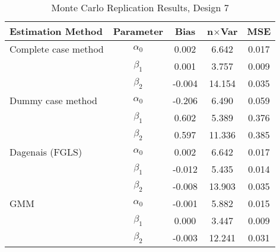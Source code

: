 \begin{table}
\centering
\caption{Monte Carlo Replication Results, Design 7}
\label{table:MCReplicationResultsDesign7}
\begin{tabular}{lcccc}
\toprule
Estimation Method & Parameter & Bias & n$\times$Var & MSE \\
\midrule
Complete case method & $\alpha_0$ & 0.002 & 6.642 & 0.017 \\
 & $\beta_1$ & 0.001 & 3.757 & 0.009 \\
 & $\beta_2$ & -0.004 & 14.154 & 0.035 \\
Dummy case method & $\alpha_0$ & -0.206 & 6.490 & 0.059 \\
 & $\beta_1$ & 0.602 & 5.389 & 0.376 \\
 & $\beta_2$ & 0.597 & 11.336 & 0.385 \\
Dagenais (FGLS) & $\alpha_0$ & 0.002 & 6.642 & 0.017 \\
 & $\beta_1$ & -0.012 & 5.435 & 0.014 \\
 & $\beta_2$ & -0.008 & 13.903 & 0.035 \\
GMM & $\alpha_0$ & -0.001 & 5.882 & 0.015 \\
 & $\beta_1$ & 0.000 & 3.447 & 0.009 \\
 & $\beta_2$ & -0.003 & 12.241 & 0.031 \\
\bottomrule
\end{tabular}
\end{table}
